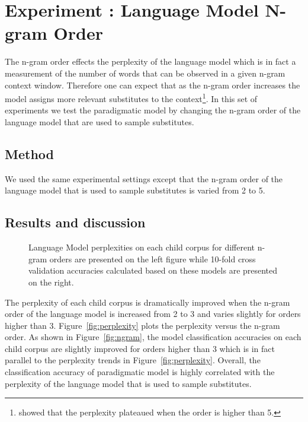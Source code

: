 \section{Experiment : Language Model N-gram Order}
\label{s:exp_ngram}
The n-gram order effects the perplexity of the language model which is in fact
a measurement of the number of words that can be observed in a given n-gram
context window.  Therefore one can expect that as the n-gram order increases
the model assigns more relevant substitutes to the
context\footnote{\cite{Goodman2001403} showed that the perplexity plateaued when
the order is higher than 5.}.  In this set of experiments we test the
paradigmatic model by changing the n-gram order of the language model that are
used to sample substitutes.

\subsection{Method}
We used the same experimental settings except that the n-gram order of the
language model that is used to sample substitutes is varied from 2 to
5. 

\subsection{Results and discussion}
\begin{figure}[h!]
  \caption{Language Model perplexities on each child corpus for different
  n-gram orders are presented on the left figure while 10-fold cross validation
  accuracies calculated based on these models are presented on the right.} 
\end{figure}

The perplexity of each child corpus is dramatically improved when the n-gram
order of the language model is increased from 2 to 3 and varies slightly for
orders higher than 3.  Figure~\ref{fig:perplexity} plots the perplexity versus
the n-gram order.  As shown in Figure~\ref{fig:ngram}, the model classification
accuracies on each child corpus are slightly improved for orders higher than 3
which is in fact parallel to the perplexity trends in
Figure~\ref{fig:perplexity}.  Overall, the classification accuracy of
paradigmatic model is highly correlated with the perplexity of the language
model that is used to sample substitutes.

